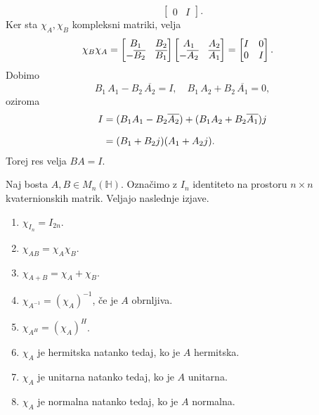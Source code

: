 \documentclass[mat1, tisk]{fmfdelo}
\numberwithin{equation}{section}
\begin{document}
\begin{dokaz}
$$\begin{bmatrix}
        0 & I
    \end{bmatrix}.$$
    Ker sta $\chi_{A}, \chi_{B}$ kompleksni matriki, velja 
    \begin{equation*}
        \setlength{\jot}{10pt}
            \begin{aligned}
                \chi_{B} \chi_{A} &=
                \begin{bmatrix}
                    B_{1} & B_{2}\\
                    -\overline{B_{2}} & \overline{B_{1}}
                \end{bmatrix}
                \begin{bmatrix}
                    A_{1} & A_{2} \\
                    -\overline{A_{2}} & \overline{A_{1}}
                \end{bmatrix} 
                =
                \begin{bmatrix}
                    I & 0\\
                    0 & I
                \end{bmatrix}.
            \end{aligned}  
    \end{equation*}
    Dobimo
    $$B_{1} \, A_{1} - B_{2} \, \overline{A_{2}} = I, \quad
                B_{1} \, A_{2} + B_{2} \, \overline{A_{1}} = 0,$$
    oziroma
    \begin{equation*}
        \setlength{\jot}{10pt}
            \begin{aligned}
                I &= (B_{1}A_{1} - B_{2}\overline{A_{2}})+(B_{1}A_{2} + B_{2}\overline{A_{1}})j \\
                &=(B_{1} + B_{2}j)(A_{1} + A_{2}j).
            \end{aligned}  
    \end{equation*} 
    Torej res velja $BA = I$.

\end{dokaz}


\begin{trditev}\label{eq5}
    Naj bosta $A, B \in M_{n}(\mathbb{H})$. Označimo z $I_{n}$ identiteto na prostoru $n \times n$ kvaternionskih matrik. Veljajo naslednje izjave.
    \begin{enumerate}
        \item $\chi_{I_{n}} = I_{2n}$.
        \item $\chi_{AB} = \chi_{A} \chi_{B}$.
        \item $\chi_{A+B} = \chi_{A} + \chi_{B}$.
        \item $\chi_{A^{-1}} = (\chi_{A})^{-1}$, če je $A$ obrnljiva.
        \item $\chi_{A^{H}} = (\chi_{A})^{H}$.
        \item $\chi_{A}$ je hermitska natanko tedaj, ko je $A$ hermitska.
        \item $\chi_{A}$ je unitarna natanko tedaj, ko je $A$ unitarna.
        \item $\chi_{A}$ je normalna natanko tedaj, ko je $A$ normalna.
    \end{enumerate}
\end{trditev}
\end{document}
